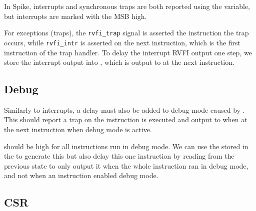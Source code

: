 In Spike, interrupts and synchronous traps are both reported using the  variable, but interrupts are marked with the MSB high.

For exceptions (traps), the \lstinline{rvfi_trap} signal is asserted the instruction the trap occurs, while \lstinline{rvfi_intr} is asserted on the next instruction, which is the first instruction of the trap handler. To delay the interrupt RVFI output one step, we store the interrupt output into , which is output to  at the next instruction.



\subsection{Debug}

Similarly to interrupts, a delay must also be added to debug mode caused by . This should report a trap on the instruction  is executed and output to  when at the next instruction when debug mode is active.

 should be high for all instructions run in debug mode. We can use the  stored in the  to generate this but also delay this one instruction by reading from the previous state to only output it when the whole instruction ran in debug mode, and not when an instruction enabled debug mode.

\subsection{CSR}

